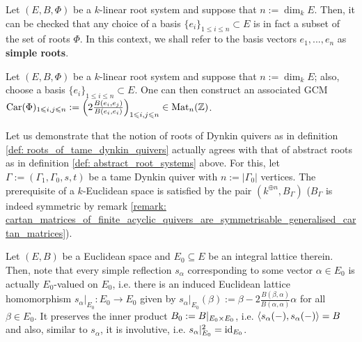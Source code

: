             \begin{example} \label{example: simple_roots}
                Let $(E, B, \Phi)$ be a $k$-linear root system and suppose that $n := \dim_k E$. Then, it can be checked that any choice of a basis $\{e_i\}_{1 \leq i \leq n} \subset E$ is in fact a subset of the set of roots $\Phi$. In this context, we shall refer to the basis vectors $e_1, ..., e_n$ as \textbf{simple roots}.
            \end{example}
            \begin{definition} \label{def: generalised_cartan_matrices_of_root_systems}
                Let $(E, B, \Phi)$ be a $k$-linear root system and suppose that $n := \dim_k E$; also, choose a basis $\{e_i\}_{1 \leq i \leq n} \subset E$. One can then construct an associated GCM $\mathrm{Car}(\Phi)_{1 \leqslant i, j \leqslant n} := \left(2\frac{B(e_i, e_j)}{B(e_i, e_i)}\right)_{1 \leqslant i, j \leqslant n} \in \mathrm{Mat}_n(\mathbb{Z})$.
            \end{definition}
            \begin{example} \label{example: root_systems_of_tame_dynkin_quivers}
                Let us demonstrate that the notion of roots of Dynkin quivers as in definition \ref{def: roots_of_tame_dynkin_quivers} actually agrees with that of abstract roots as in definition \ref{def: abstract_root_systems} above. For this, let $\Gamma := (\Gamma_1, \Gamma_0, s, t)$ be a tame Dynkin quiver with $n := |\Gamma_0|$ vertices. The prerequisite of a $k$-Euclidean space is satisfied by the pair $(k^{\oplus n}, B_{\Gamma})$ ($B_{\Gamma}$ is indeed symmetric by remark \ref{remark: cartan_matrices_of_finite_acyclic_quivers_are_symmetrisable_generalised_cartan_matrices}).
            \end{example}
            \begin{remark} \label{remark: integral_simple_reflections}
                Let $(E, B)$ be a Euclidean space and $E_0 \subseteq E$ be an integral lattice therein. Then, note that every simple reflection $s_{\alpha}$ corresponding to some vector $\alpha \in E_0$ is actually $E_0$-valued on $E_0$, i.e. there is an induced Euclidean lattice homomorphism $s_{\alpha}|_{E_0}: E_0 \to E_0$ given by $s_{\alpha}|_{E_0}(\beta) := \beta - 2\frac{B(\beta, \alpha)}{B(\alpha, \alpha)} \alpha$ for all $\beta \in E_0$. It preserves the inner product $B_0 := B|_{E_0 \x E_0}$, i.e. $\langle s_{\alpha}(-), s_{\alpha}(-)\rangle =B$ and also, similar to $s_{\alpha}$, it is involutive, i.e. $s_{\alpha}|_{E_0}^2 = \mathrm{id}_{E_0}$.
            \end{remark}
